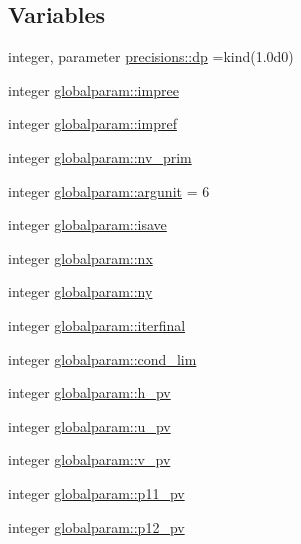 \subsection*{Variables}
\begin{DoxyCompactItemize}
\item 
integer, parameter \mbox{\hyperlink{namespaceprecisions_a70c0046430d95734ae5df77254ce2897}{precisions\+::dp}} =kind(1.\+0d0)
\item 
integer \mbox{\hyperlink{namespaceglobalparam_a877f19a98e7a5d2d29ccb999f6a4b30b}{globalparam\+::impree}}
\item 
integer \mbox{\hyperlink{namespaceglobalparam_ac4d90a4b214d99ef729a938064face25}{globalparam\+::impref}}
\item 
integer \mbox{\hyperlink{namespaceglobalparam_a09fefe9eafe1d81a6be970794c775e36}{globalparam\+::nv\+\_\+prim}}
\item 
integer \mbox{\hyperlink{namespaceglobalparam_a0f36e5940fffe44f73fbab54574ce74d}{globalparam\+::argunit}} = 6
\item 
integer \mbox{\hyperlink{namespaceglobalparam_a41b8aacbc46aa9d8341860c8a0481a44}{globalparam\+::isave}}
\item 
integer \mbox{\hyperlink{namespaceglobalparam_a3d0778a63b55337acd79aa06b9030ad0}{globalparam\+::nx}}
\item 
integer \mbox{\hyperlink{namespaceglobalparam_ae3e17c94b4a693ce99dc99ca85e3aba5}{globalparam\+::ny}}
\item 
integer \mbox{\hyperlink{namespaceglobalparam_a823f2901e26e8ed4b22569b63173f812}{globalparam\+::iterfinal}}
\item 
integer \mbox{\hyperlink{namespaceglobalparam_a0dfd817bc37d123c49006e2b980414c5}{globalparam\+::cond\+\_\+lim}}
\item 
integer \mbox{\hyperlink{namespaceglobalparam_a46daf38606bdbc2d5b4a2864c28cae5e}{globalparam\+::h\+\_\+pv}}
\item 
integer \mbox{\hyperlink{namespaceglobalparam_acbf50879a37a52fcc5fc5e0f06b209ba}{globalparam\+::u\+\_\+pv}}
\item 
integer \mbox{\hyperlink{namespaceglobalparam_a980a183375fbe21d1ba02b3611dcc94d}{globalparam\+::v\+\_\+pv}}
\item 
integer \mbox{\hyperlink{namespaceglobalparam_a454092edac459f96bb9045ced3f632bd}{globalparam\+::p11\+\_\+pv}}
\item 
integer \mbox{\hyperlink{namespaceglobalparam_a9d0f6eb467ec66a6825d64e743f0fc36}{globalparam\+::p12\+\_\+pv}}
\item 

\end{DoxyCompactItemize}
